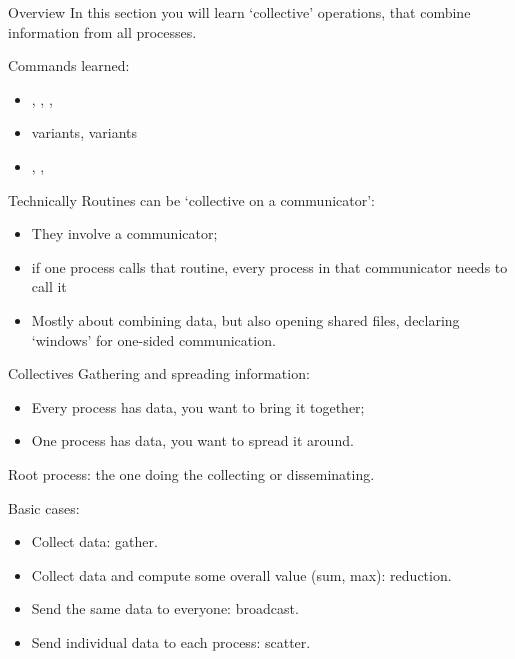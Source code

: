 
\begin{numberedframe}{Overview}
  In this section you will learn `collective' operations, that combine
  information from all processes.

  Commands learned:
  \begin{itemize}
  \item {}, , , 
  \item {} variants,  variants
  \item {}, , 
  \end{itemize}
\end{numberedframe}

\begin{numberedframe}{Technically}
  Routines can be `collective on a communicator': 
  \begin{itemize}
  \item They involve a communicator;
  \item if one process calls that routine, every process in that
    communicator needs to call it
  \item Mostly about combining data, but also opening shared files,
    declaring `windows' for one-sided communication.
  \end{itemize}
\end{numberedframe}

\begin{numberedframe}{Collectives}
  Gathering and spreading information:
  \begin{itemize}
  \item Every process has data, you want to bring it together;
  \item One process has data, you want to spread it around.
  \end{itemize}
  Root process: the one doing the collecting or disseminating.

  Basic cases:
  \begin{itemize}
  \item Collect data: gather.
  \item Collect data and compute some overall value (sum, max): reduction.
  \item Send the same data to everyone: broadcast.
  \item Send individual data to each process: scatter.
  \end{itemize}
\end{numberedframe}

